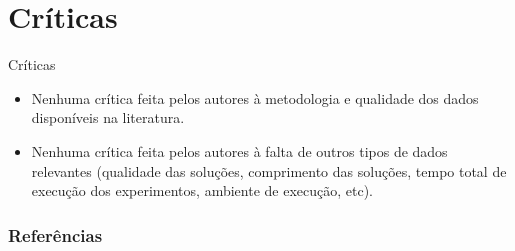 \documentclass[aspectratio=169,xcolor=table]{beamer}
\begin{document}
\section{Críticas}
\begin{frame}{Críticas}
  \begin{itemize}
    \item Nenhuma crítica feita pelos autores à metodologia e qualidade
      dos dados disponíveis na literatura.
    \item Nenhuma crítica feita pelos autores à falta de outros tipos de dados
      relevantes (qualidade das soluções, comprimento das soluções, tempo total
      de execução dos experimentos, ambiente de execução, etc).
  \end{itemize}
\end{frame}

\begin{frame}[allowframebreaks]
    \frametitle{Referências}

    
    
\end{frame}
\end{document}

